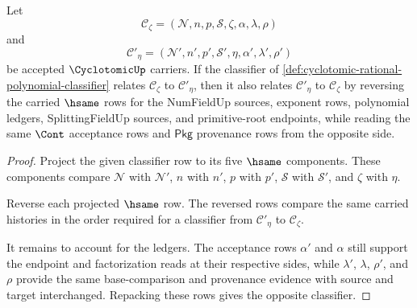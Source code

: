 \begin{theorem}
\label{thm:cyclotomic-classifier-symmetric}
Let
$$
\mathcal{C}_{\zeta}=(\mathcal{N},n,p,\mathcal{S},\zeta,\alpha,\lambda,\rho)
$$
and
$$
\mathcal{C}'_{\eta}=(\mathcal{N}',n',p',\mathcal{S}',\eta,\alpha',\lambda',\rho')
$$
be accepted $\CyclotomicUp$ carriers. If the classifier of \autoref{def:cyclotomic-rational-polynomial-classifier} relates $\mathcal{C}_{\zeta}$ to $\mathcal{C}'_{\eta}$, then it also relates $\mathcal{C}'_{\eta}$ to $\mathcal{C}_{\zeta}$ by reversing the carried $\hsame$ rows for the NumFieldUp sources, exponent rows, polynomial ledgers, SplittingFieldUp sources, and primitive-root endpoints, while reading the same $\Cont$ acceptance rows and $\mathsf{Pkg}$ provenance rows from the opposite side.
\end{theorem}
\begin{proof}
Project the given classifier row to its five $\hsame$ components. These components compare $\mathcal{N}$ with $\mathcal{N}'$, $n$ with $n'$, $p$ with $p'$, $\mathcal{S}$ with $\mathcal{S}'$, and $\zeta$ with $\eta$.

Reverse each projected $\hsame$ row. The reversed rows compare the same carried histories in the order required for a classifier from $\mathcal{C}'_{\eta}$ to $\mathcal{C}_{\zeta}$.

It remains to account for the ledgers. The acceptance rows $\alpha'$ and $\alpha$ still support the endpoint and factorization reads at their respective sides, while $\lambda'$, $\lambda$, $\rho'$, and $\rho$ provide the same base-comparison and provenance evidence with source and target interchanged. Repacking these rows gives the opposite classifier.
\end{proof}

